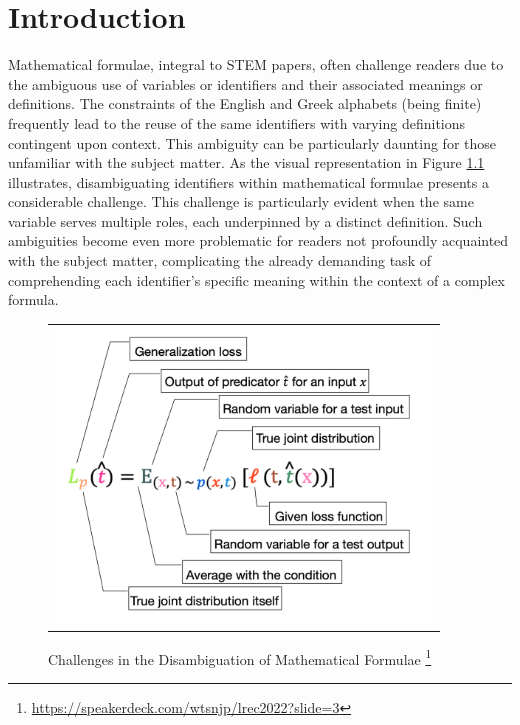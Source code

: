 \chapter{Introduction}\label{chapter:introduction}

Mathematical formulae, integral to \ac{STEM} papers, often challenge readers due to the ambiguous use of variables or identifiers and their associated meanings or definitions. The constraints of the English and Greek alphabets (being finite) frequently lead to the reuse of the same identifiers with varying definitions contingent upon context. This ambiguity can be particularly daunting for those unfamiliar with the subject matter. As the visual representation in Figure \ref{fig:introduction-motivation} illustrates, disambiguating identifiers within mathematical formulae presents a considerable challenge. This challenge is particularly evident when the same variable serves multiple roles, each underpinned by a distinct definition. Such ambiguities become even more problematic for readers not profoundly acquainted with the subject matter, complicating the already demanding task of comprehending each identifier's specific meaning within the context of a complex formula.

\begin{figure}[htpb]
  \centering
  \begin{tabular}{c}
    \includegraphics[width=10cm]{images/introduction-motivation.png}
  \end{tabular}
  \caption[Challenges in Disambiguation]{Challenges in the Disambiguation of Mathematical Formulae \footnote{\url{https://speakerdeck.com/wtsnjp/lrec2022?slide=3}}}\label{fig:introduction-motivation}
\end{figure}


